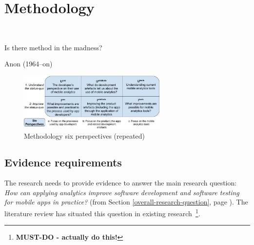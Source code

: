 \chapter{Methodology}~\label{chapter-methodology}
\epigraph{Is there method in the madness?}{Anon (1964--on)}

\begin{figure}
  \vspace{-0.75\intextsep}
  \begin{center}
    \includegraphics[width=0.66\textwidth]{images/my/six-perspectives-2x3-matrix-12-nov-2021.jpeg}
  \end{center}
    \caption{Methodology six perspectives (repeated)}
    \label{fig:six-perspectives-in-the-methodology}
\end{figure}

%

\section{Evidence requirements}
The research needs to provide evidence to answer the main research question: \emph{How can applying analytics improve software development and software testing for mobile apps in practice?} (from Section \ref{overall-research-question}, page \pageref{overall-research-question}). The literature review has situated this question in existing research~\footnote{\textbf{MUST-DO - actually do this!}}.  


